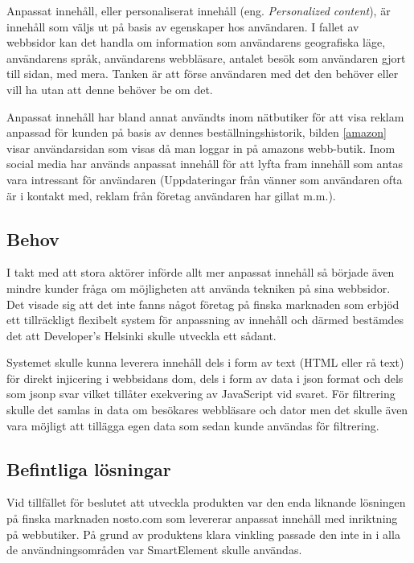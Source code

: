 Anpassat innehåll, eller personaliserat innehåll (eng. \textit{Personalized content}), är innehåll som väljs ut på basis av egenskaper hos användaren. I fallet av webbsidor kan det handla om information som användarens geografiska läge, användarens språk, användarens webbläsare, antalet besök som användaren gjort till sidan, med mera. Tanken är att förse användaren med det den behöver eller vill ha utan att denne behöver be om det. \citep{cotacm43}

Anpassat innehåll har bland annat användts inom nätbutiker för att visa reklam anpassad för kunden på basis av dennes beställningshistorik, bilden \ref{amazon} visar användarsidan som visas då man loggar in på amazons webb-butik. Inom social media har används anpassat innehåll för att lyfta fram innehåll som antas vara intressant för användaren (Uppdateringar från vänner som användaren ofta är i kontakt med, reklam från företag användaren har gillat m.m.). \citep{socialmedia}


\subsection{Behov}

I takt med att stora aktörer införde allt mer anpassat innehåll så började även mindre kunder fråga om möjligheten att använda tekniken på sina webbsidor. Det visade sig att det inte fanns något företag på finska marknaden som erbjöd ett tillräckligt flexibelt system för anpassning av innehåll och därmed bestämdes det att Developer's Helsinki skulle utveckla ett sådant.

Systemet skulle kunna leverera innehåll dels i form av text (HTML eller rå text) för direkt injicering i webbsidans \gls{dom}, dels i form av data i \gls{json} format och dels som \gls{jsonp} svar vilket tillåter exekvering av JavaScript vid svaret. För filtrering skulle det samlas in data om besökares webbläsare och dator men det skulle även vara möjligt att tillägga egen data som sedan kunde användas för filtrering.

\subsection{Befintliga lösningar}

Vid tillfället för beslutet att utveckla produkten var den enda liknande lösningen på finska marknaden nosto.com som levererar anpassat innehåll med inriktning på webbutiker.\citep{nosto} På grund av produktens klara vinkling passade den inte in i alla de användningsområden var SmartElement skulle användas.



